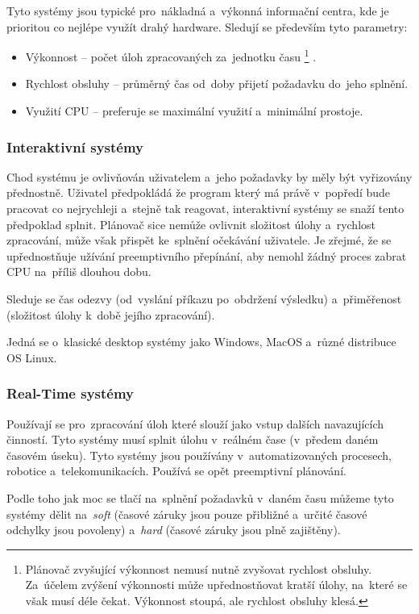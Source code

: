 Tyto systémy jsou typické pro~nákladná a~výkonná informační centra, kde je prioritou co nejlépe využít drahý hardware. Sledují se především tyto parametry:

\begin{itemize}
	\item Výkonnost -- počet úloh zpracovaných za~jednotku času%
	\footnote{Plánovač zvyšující výkonnost nemusí nutně zvyšovat rychlost obsluhy. Za~účelem zvýšení výkonnosti může upřednostňovat kratší úlohy, na~které se však musí déle čekat. Výkonnost stoupá, ale rychlost obsluhy klesá.}%
	.
	\item Rychlost obsluhy -- průměrný čas od~doby přijetí požadavku do~jeho splnění.
	\item Využití CPU -- preferuje se maximální využití a~minimální prostoje.
\end{itemize}

\subsubsection{Interaktivní systémy}

Chod systému je ovlivňován uživatelem a~jeho požadavky by měly být vyřizovány přednostně. Uživatel předpokládá že program který má právě v~popředí bude pracovat co nejrychleji a~stejně tak reagovat, interaktivní systémy se snaží tento předpoklad splnit. Plánovač sice nemůže ovlivnit složitost úlohy a~rychlost zpracování, může však přispět ke~splnění očekávání uživatele. Je zřejmé, že se upřednostňuje užívání preemptivního přepínání, aby nemohl žádný proces zabrat CPU na~příliš dlouhou dobu.

Sleduje se čas odezvy (od~vyslání příkazu po~obdržení výsledku) a~přiměřenost (složitost úlohy k~době jejího zpracování).

Jedná se o~klasické desktop systémy jako Windows, MacOS a~různé distribuce OS Linux.

\subsubsection{Real-Time systémy}

Používají se pro~zpracování úloh které slouží jako vstup dalších navazujících činností. Tyto systémy musí splnit úlohu v~reálném čase (v~předem daném časovém úseku). Tyto systémy jsou používány v~automatizovaných procesech, robotice a~telekomunikacích. Používá se opět preemptivní plánování.

Podle toho jak moc se tlačí na~splnění požadavků v~daném času můžeme tyto systémy dělit na~\emph{soft} (časové záruky jsou pouze přibližné a~určité časové odchylky jsou povoleny) a~\emph{hard} (časové záruky jsou plně zajištěny).

